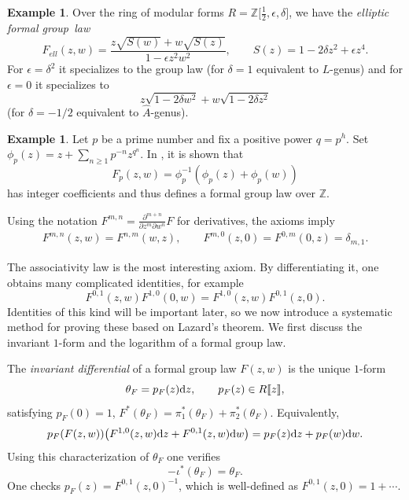 \documentclass[pdftex]{sigma}
\numberwithin{equation}{section}
\theoremstyle{definition}
\newtheorem{Example}[Theorem]{Example}
\def\lb{\llbracket}
\def\rb{\rrbracket}
\begin{document}
\begin{Example}
Over the ring of modular forms $R=\mathbb{Z}\big[\frac12,\epsilon,\delta\big]$, we have the \emph{elliptic formal group~law}
\[
 F_{ell}(z,w)=\frac{z\sqrt{S(w)}+w\sqrt{S(z)}}{1-\epsilon z^2w^2},\qquad S(z)=1-2\delta z^2+\epsilon z^4.
\]
For $\epsilon=\delta^2$ it specializes to the group law
(for $\delta=1$ equivalent to $L$-genus) and for $\epsilon=0$ it specializes to
\[
 z\sqrt{1-2\delta w^2}+w\sqrt{1-2\delta z^2}
\]
(for $\delta=-1/2$ equivalent to $\hat{A}$-genus).
\end{Example}

\begin{Example}
\label{PrimeFGL}
 Let $p$ be a prime number and fix a positive power $q=p^h$. Set $\phi_p(z)=z+\sum_{n\geqslant1}p^{-n}z^{q^n}$. In \cite{Haze}, it is shown that
\[
 F_p(z,w)=\phi_p^{-1}(\phi_p(z)+\phi_p(w))
\]
 has integer coefficients and thus defines a formal group law over $\mathbb{Z}$.
\end{Example}

Using the notation $F^{m,n}=\frac{\partial^{m+n}}{\partial z^m\partial w^n}F$ for derivatives, the axioms imply
\begin{align*}
 F^{m,n}(z,w)=F^{n,m}(w,z),\qquad
 F^{m,0}(z,0)=F^{0,m}(0,z)=\delta_{m,1}.
\end{align*}

The associativity law is the most interesting axiom. By differentiating it, one obtains many complicated identities, for example
\begin{equation}
\label{ComplicatedIdentity}
F^{0,1}(z,w)F^{1,0}(0,w)=F^{1,0}(z,w)F^{0,1}(z,0).
\end{equation}
Identities of this kind will be important later, so we now introduce a systematic method for proving these based on Lazard's theorem. We first discuss the invariant $1$-form and the logarithm of a formal group law.

The \emph{invariant differential} of a formal group law $F(z,w)$ is the unique $1$-form
\begin{equation}\label{Invariant_One_Form}
 \theta_F=p_F(z){\rm d}z,\qquad p_F(z)\in R\lb z\rb,
\end{equation}
satisfying
$
 p_F(0)=1$, $ F^*(\theta_F)=\pi_1^*(\theta_F)+\pi_2^*(\theta_F)$.
Equivalently,
\begin{equation}
\label{Invariant_One_Form_Equivalent_Char}
 p_F(F(z,w))\bigl(F^{1,0}(z,w){\rm d}z+F^{0,1}(z,w){\rm d}w\bigr)=p_F(z){\rm d}z+p_F(w){\rm d}w.
\end{equation}
Using this characterization of $\theta_F$ one verifies
\begin{equation}
\label{Invariant_Form_Inverse}
 -\iota^*(\theta_F)=\theta_F.
\end{equation}
One checks $p_F(z)=F^{0,1}(z,0)^{-1}$, which is well-defined as $F^{0,1}(z,0)=1+\cdots$.
\end{document}
